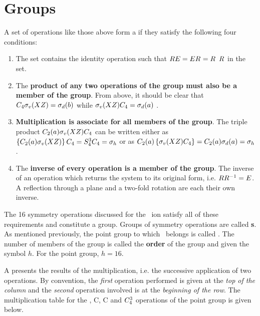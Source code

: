 \section{Groups}

A set of operations like those above form a  if they satisfy the following four conditions:

\begin{enumerate}
    \item The set contains the identity operation  such that $\symop{RE} = \symop{ER} = \symop{R}$ \forall $\symop{R}$ in the set.
    \item The \textbf{product of any two operations of the group must also be a member of the group}. From above, it should be clear that $\symop[4]C \symop[v]{\sigma} (XZ) = \symop[d]{\sigma} (b)$ while $\symop[v]{\sigma} (XZ)\symop[4]C = \symop[d]{\sigma} (a)$ .
    \item \textbf{Multiplication is associate for all members of the group}. The triple product $\symop[2]C (a) \symop[v]{\sigma} (XZ) \symop[4]C$ can be written either as $\left\{\symop[2]C (a) \symop[v]{\sigma} (XZ)\right\}\symop[4]C = \symop[4]S^3\symop[4]C = \symop[h]{\sigma}$ or as $\symop[2]C (a) \left\{\symop[v]{\sigma} (XZ) \symop[4]C\right\} = \symop[2]C (a) \symop[d]{\sigma} (a) = \symop[h]{\sigma}$.
    \item The \textbf{inverse of every operation is a member of the group}. The inverse of an operation which returns the system to its original form, i.e. $\symop{RR^{-1}} = \symop{E}$. A reflection through a plane and a two-fold rotation are each their own inverse.
\end{enumerate}

The 16 symmetry operations discussed for the \ptcl\ ion satisfy all of these requirements and constitute a group.
Groups of symmetry operations are called \textbf s.
As mentioned previously, the point group to which \ptcl\ belongs is called .
The number of members of the group is called the \textbf{order} of the group and given the symbol $h$. For the  point group, $h=16$.

A  presents the results of the multiplication, i.e. the successive application of two operations.
By convention, the \emph{first} operation performed is given at the \emph{top of the column} and the \emph{second} operation involved is at the \emph{beginning of the row}.
The multiplication table for the , \symop[4]C, \symop[2]C and $\symop[4]C^3$ operations of the  point group is given below.

